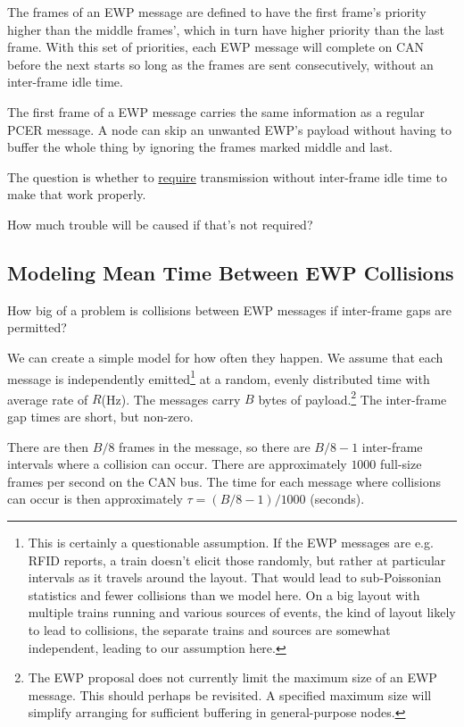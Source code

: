 \documentclass[11pt]{article}
\begin{document}
The frames of an EWP message are defined to have the first frame's priority 
higher than the middle frames', which in turn have higher priority than the last frame.
With this set of priorities, each EWP message will complete on CAN before the
next starts so long as the frames are sent consecutively, without an inter-frame idle time.

The first frame of a EWP message carries the same information as a regular PCER message.
A node can skip an unwanted EWP's payload without having to buffer the whole thing
by ignoring the frames marked middle and last.

The question is whether to \underline{require} transmission without
inter-frame idle time to make that work properly.

How much trouble will be caused if that's not required?

\subsection{Modeling Mean Time Between EWP Collisions}

\cbstart
How big of a problem is collisions between EWP messages
if inter-frame gaps are permitted?
\cbend

We can create a simple model for how often they happen.
We assume that each message is 
independently emitted\footnote{
    This is certainly a questionable assumption.  If the EWP messages are
    e.g. RFID reports, a train doesn't elicit those randomly, but rather
    at particular intervals as it travels around the layout.  That would
    lead to sub-Poissonian statistics and fewer collisions than we model here.
    On a big layout with multiple trains running and various sources of events, 
    the kind of layout likely to lead to collisions, the separate trains and
    sources are somewhat independent, leading to our assumption here.}
at a random, 
evenly distributed time with average rate of $R$(Hz).
The messages carry $B$ bytes of 
payload.\footnote{The EWP proposal does not currently limit the maximum size of an EWP
    message.  This should perhaps be revisited. A specified maximum size will simplify
    arranging for sufficient buffering in general-purpose nodes.}
The inter-frame gap times are short, but non-zero.

There are then
$B/8$ frames in the message, so there are $B/8-1$ inter-frame intervals where 
a collision can occur.  
There are approximately $1000$
full-size frames per second on the CAN bus.
The time for each message where collisions can
occur is then approximately $\tau = (B/8-1)/1000$ (seconds). 
\end{document}
